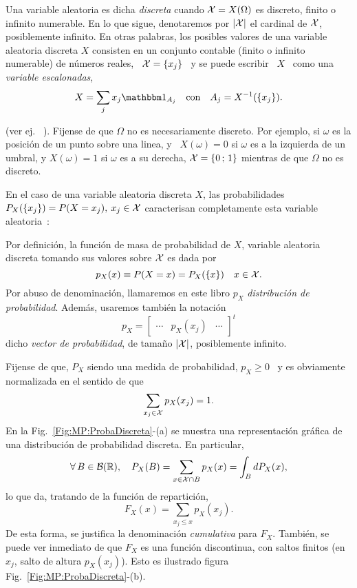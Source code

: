 \begin{definicion}
\label{Def:MP:VariableAleatoriaDiscreta}
%
  Una  variable aleatoria es  dicha {\it  discreta} cuando  $\mathcal{X} =  X(\Omega)$ es
  discreto,  finito o  infinito numerable.   En  lo que  sigue, denotaremos  por
  $|\mathcal{X}|$  el cardinal  de $\mathcal{X}$,  posiblemente infinito.  En otras  palabras, los
  posibles  valores de  una  variable  aleatoria discreta  $X$  consisten en  un
  conjunto contable (finito  o infinito numerable) de n\'umeros  reales, \ $\mathcal{X} =
  \{ x_j \}$ \ y se puede escribir \ $X$ \ como una {\it variable escalonadas},
  \[
  X = \sum_j x_j \un_{A_j} \quad \mbox{con} \quad A_j = X^{-1}(\{ x_j \}).
  \]
\end{definicion}
%
\noindent (ver ej.  ~\cite{AthLah06, HogMck13}).  Fijense de que  $\Omega$ no es
necesariamente discreto.  Por ejemplo, si  $\omega$ es la posici\'on de un punto
sobre una linea, y \ $X(\omega) = 0$ si $\omega$ es a la izquierda de un umbral, y
$X(\omega) = 1$ si $\omega$  es a su derecha, $\mathcal{X} = \{ 0 \,  ; \, 1 \}$ mientras
de que $\Omega$ no es discreto.

En el  caso de una variable  aleatoria discreta $X$,  las probabilidades $P_X(\{
x_j \})  = P(X = x_j), \:  x_j \in \mathcal{X}$ caracterisan  completamente esta variable
aleatoria~\cite{AthLah06, HogMck13}:
%
\begin{definicion}
\label{Def:MP:MasaProbabilidad}
%
  Por  definici\'on, la  funci\'on  de  masa de  probabilidad  de $X$,  variable
  aleatoria discreta tomando sus valores sobre $\mathcal{X}$ es dada por
  \[
  p_X(x) \equiv P(X = x) = P_X( \{ x\} ) \quad x \in \mathcal{X}.
  \]
  Por   abuso  de   denominaci\'on,  llamaremos   en  este   libro   $p_X$  {\it
    distribuci\'on de probabilidad}. Adem\'as, usaremos tambi\'en la notaci\'on
  \[
  p_X = \begin{bmatrix} \cdots & p_X(x_j) & \cdots \end{bmatrix}^t
  \]
  dicho {\it vector de probabilidad}, de tama\~no $|\mathcal{X}|$, posiblemente infinito.
\end{definicion}
%
Fijense de  que, $P_X$ siendo  una medida  de probabilidad, $p_X  \ge 0$ \  y es
obviamente normalizada en el sentido de que
%
\[
\sum_{x_j \in \mathcal{X}} p_X(x_j) = 1.
\]
%
En  la  Fig.~\ref{Fig:MP:ProbaDiscreta}-(a)   se  muestra  una  representaci\'on
gr\'afica de una distribuci\'on de probabilidad discreta.
%
En particular,
%
\[
\forall \,  B \in  \mathcal{B}(\mathbb{R}), \quad  P_X(B) = \sum_{x  \in \mathcal{X}  \cap B}  p_X(x) =
\int_B dP_X(x),
\]
%
lo que da, tratando de la funci\'on de repartici\'on,
%
\[
F_X(x) = \sum_{x_j \le x} p_X(x_j).
\]
%
De  esta forma,  se justifica  la  denominaci\'on {\it  cumulativa} para  $F_X$.
Tambi\'en, se puede ver inmediato de que $F_X$ es una funci\'on discontinua, con
saltos finitos (en  $x_j$, salto de altura $p_X(x_j)$).  Esto es ilustrado figura
Fig.~\ref{Fig:MP:ProbaDiscreta}-(b).

